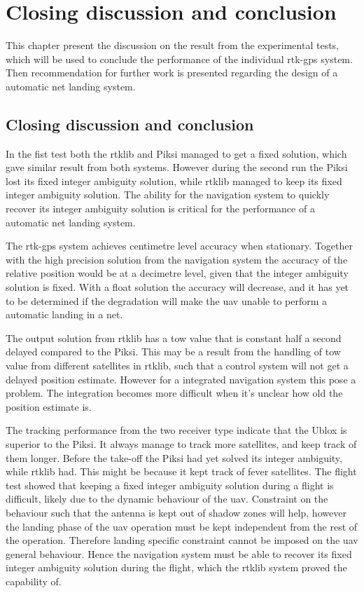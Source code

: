 
\chapter{Closing discussion and conclusion}
This chapter present the discussion on the result from the experimental tests, which will be used to conclude the performance of the individual \gls{rtk-gps} system. Then recommendation for further work is presented regarding the design of a automatic net landing system.
\section{Closing discussion and conclusion}
In the fist test both the \gls{rtklib} and Piksi managed to get a fixed solution, which gave similar result from both systems. However during the second run the Piksi lost its fixed integer ambiguity solution, while \gls{rtklib} managed to keep its fixed integer ambiguity solution. The ability for the navigation system to quickly recover its integer ambiguity solution is critical for the performance of a automatic net landing system.

The \gls{rtk-gps} system achieves centimetre level accuracy when stationary. Together with the high precision solution from the navigation system the accuracy of the relative position would be at a decimetre level, given that the integer ambiguity solution is fixed. With a float solution the accuracy will decrease, and it has yet to be determined if the degradation will make the \gls{uav} unable to perform a automatic landing in a net.

The output solution from \gls{rtklib} has a \acrfull{tow} value that is constant half a second delayed compared to the Piksi. This may be a result from the handling of \gls{tow} value from different satellites in \gls{rtklib}, such that a control system will not get a delayed position estimate. However for a integrated navigation system this pose a problem. The integration becomes more difficult when it's unclear how old the position estimate is.

The tracking performance from the two receiver type indicate that the Ublox is superior to the Piksi. It always manage to track more satellites, and keep track of them longer.
Before the take-off the Piksi had yet solved its integer ambiguity, while \gls{rtklib} had. This might be because it kept track of fever satellites. 
The flight test showed that keeping a fixed integer ambiguity solution during a flight is difficult, likely due to the dynamic behaviour of the \gls{uav}. Constraint on the behaviour such that the antenna is kept out of shadow zones will help, however the landing phase of the \gls{uav} operation must be kept independent from the rest of the operation. Therefore landing specific constraint cannot be imposed on the \gls{uav} general behaviour. Hence the navigation system must be able to recover its fixed integer ambiguity solution during the flight, which the \gls{rtklib} system proved the capability of.



